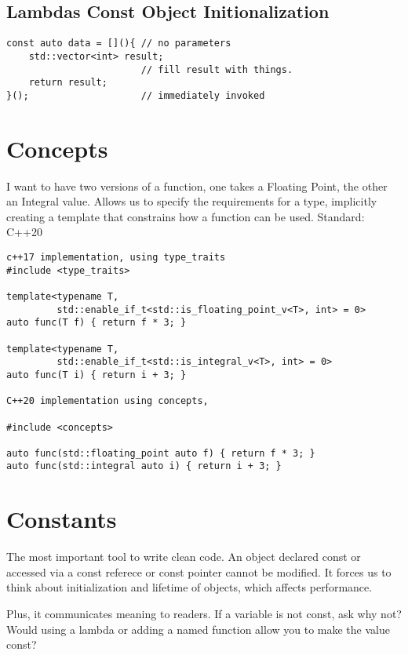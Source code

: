 \documentclass[openany]{report}
\begin{document}
\subsection{Lambdas Const Object Initionalization}

\begin{verbatim}
const auto data = [](){ // no parameters
    std::vector<int> result;
                        // fill result with things. 
    return result;
}();                    // immediately invoked
\end{verbatim}

\section{Concepts}

I want to have two versions of a function, one takes a Floating Point, the other an Integral value.
Allows us to specify the requirements for a type, implicitly creating a template
that constrains how a function can be used. Standard: C++20

\begin{verbatim}
c++17 implementation, using type_traits
#include <type_traits>

template<typename T,
         std::enable_if_t<std::is_floating_point_v<T>, int> = 0>
auto func(T f) { return f * 3; }

template<typename T,
         std::enable_if_t<std::is_integral_v<T>, int> = 0>
auto func(T i) { return i + 3; }

C++20 implementation using concepts, 

#include <concepts>

auto func(std::floating_point auto f) { return f * 3; }
auto func(std::integral auto i) { return i + 3; }
\end{verbatim}

\section{Constants}

The most important tool to write clean code.
An object declared const or accessed via a const referece or const pointer cannot be modified.
It forces us to think about initialization and lifetime of objects, which affects performance. 

Plus, it communicates meaning to readers. 
If a variable is not const, ask why not?
Would using a lambda or adding a named function allow you to make the value const?
\end{document}
